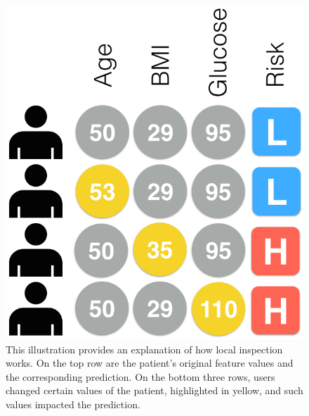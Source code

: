 
\begin{figure}[t]
\centering
\includegraphics[width=0.3\linewidth]{prospector/local-inspection-explanation} %
\caption[Explanation of how local inspection works.]{
This illustration provides an explanation of how local inspection works.  On the top row are the patient's original feature values and the corresponding prediction.  On the bottom three rows, users changed certain values of the patient, highlighted in yellow, and such values impacted the prediction.
}
\label{figs:liexplain}
\end{figure}